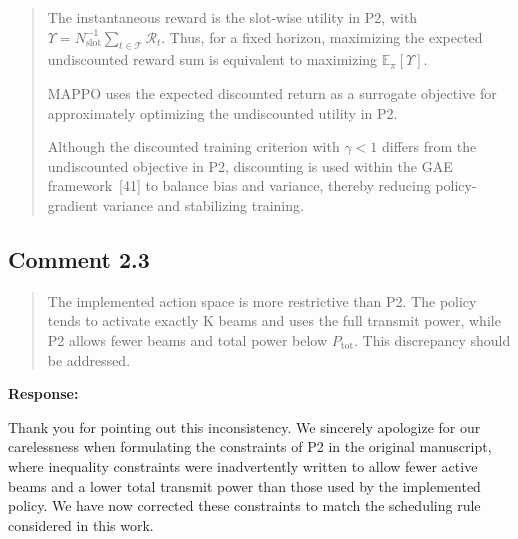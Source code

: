\documentclass[11pt,a4paper]{article}
\begin{document}

\begin{quote}\small\color{revisionblue}
The instantaneous reward is the slot-wise utility in P2, with $\Upsilon=N_{\mathrm{slot}}^{-1}\sum_{t\in\mathcal T}\mathcal R_t$. Thus, for a fixed horizon, maximizing the expected undiscounted reward sum is equivalent to maximizing $\mathbb E_\pi[\Upsilon]$.
\par

MAPPO uses the expected discounted return as a surrogate objective for approximately optimizing the undiscounted utility in P2.
\par

Although the discounted training criterion with $\gamma<1$ differs from the undiscounted objective in P2, discounting is used within the GAE framework~[41] to balance bias and variance, thereby reducing policy-gradient variance and stabilizing training.
\par
\end{quote}


\subsection*{Comment 2.3}

\begin{quote}\small The implemented action space is more restrictive than P2. The policy tends to activate exactly K beams and uses the full transmit power, while P2 allows fewer beams and total power below $P_{\mathrm{tot}}$. This discrepancy should be addressed.\end{quote}

\textbf{Response:}\par

Thank you for pointing out this inconsistency. We sincerely apologize for our carelessness when formulating the constraints of P2 in the original manuscript, where inequality constraints were inadvertently written to allow fewer active beams and a lower total transmit power than those used by the implemented policy. We have now corrected these constraints to match the scheduling rule considered in this work.
\par
\end{document}

